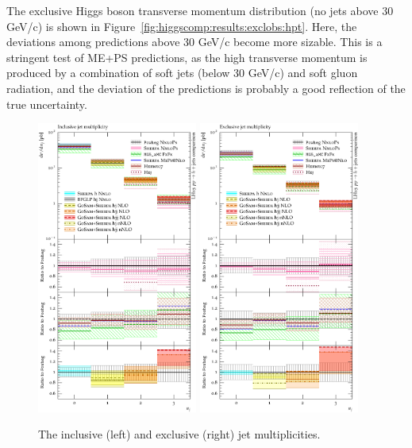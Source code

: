 The exclusive Higgs boson transverse momentum distribution (no jets
above 30 GeV/c) is shown in
Figure~\ref{fig:higgscomp:results:exclobs:hpt}. Here, the deviations
among predictions above 30 GeV/c become more sizable. This is a
stringent test of ME+PS predictions, as the high transverse momentum
is produced by a combination of soft jets (below 30 GeV/c) and soft
gluon radiation, and the deviation of the predictions is probably a
good reflection of the true uncertainty.

\begin{figure}[t!]
  \centering
  \includegraphics[width=0.47\textwidth]{figures/hjetscomp_NJet_incl_30.pdf}
  \hfill
  \includegraphics[width=0.47\textwidth]{figures/hjetscomp_NJet_excl_30.pdf}
  \caption{
    The inclusive (left) and exclusive (right) jet multiplicities.
    \label{fig:higgscomp:results:inclobs:njets}
  }
\end{figure}

